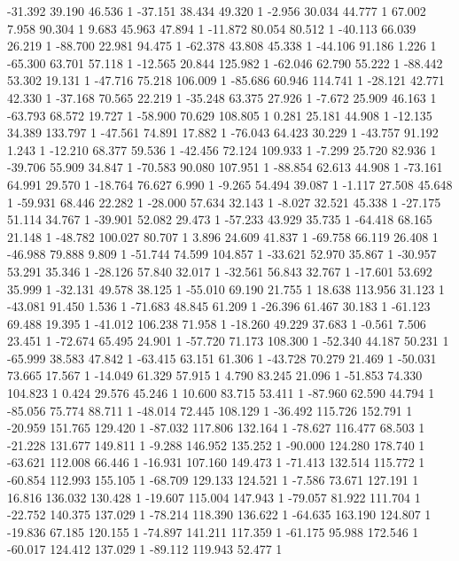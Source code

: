	-31.392 39.190 46.536 1
	-37.151 38.434 49.320 1
	-2.956 30.034 44.777 1
	67.002 7.958 90.304 1
	9.683 45.963 47.894 1
	-11.872 80.054 80.512 1
	-40.113 66.039 26.219 1
	-88.700 22.981 94.475 1
	-62.378 43.808 45.338 1
	-44.106 91.186 1.226 1
	-65.300 63.701 57.118 1
	-12.565 20.844 125.982 1
	-62.046 62.790 55.222 1
	-88.442 53.302 19.131 1
	-47.716 75.218 106.009 1
	-85.686 60.946 114.741 1
	-28.121 42.771 42.330 1
	-37.168 70.565 22.219 1
	-35.248 63.375 27.926 1
	-7.672 25.909 46.163 1
	-63.793 68.572 19.727 1
	-58.900 70.629 108.805 1
	0.281 25.181 44.908 1
	-12.135 34.389 133.797 1
	-47.561 74.891 17.882 1
	-76.043 64.423 30.229 1
	-43.757 91.192 1.243 1
	-12.210 68.377 59.536 1
	-42.456 72.124 109.933 1
	-7.299 25.720 82.936 1
	-39.706 55.909 34.847 1
	-70.583 90.080 107.951 1
	-88.854 62.613 44.908 1
	-73.161 64.991 29.570 1
	-18.764 76.627 6.990 1
	-9.265 54.494 39.087 1
	-1.117 27.508 45.648 1
	-59.931 68.446 22.282 1
	-28.000 57.634 32.143 1
	-8.027 32.521 45.338 1
	-27.175 51.114 34.767 1
	-39.901 52.082 29.473 1
	-57.233 43.929 35.735 1
	-64.418 68.165 21.148 1
	-48.782 100.027 80.707 1
	3.896 24.609 41.837 1
	-69.758 66.119 26.408 1
	-46.988 79.888 9.809 1
	-51.744 74.599 104.857 1
	-33.621 52.970 35.867 1
	-30.957 53.291 35.346 1
	-28.126 57.840 32.017 1
	-32.561 56.843 32.767 1
	-17.601 53.692 35.999 1
	-32.131 49.578 38.125 1
	-55.010 69.190 21.755 1
	18.638 113.956 31.123 1
	-43.081 91.450 1.536 1
	-71.683 48.845 61.209 1
	-26.396 61.467 30.183 1
	-61.123 69.488 19.395 1
	-41.012 106.238 71.958 1
	-18.260 49.229 37.683 1
	-0.561 7.506 23.451 1
	-72.674 65.495 24.901 1
	-57.720 71.173 108.300 1
	-52.340 44.187 50.231 1
	-65.999 38.583 47.842 1
	-63.415 63.151 61.306 1
	-43.728 70.279 21.469 1
	-50.031 73.665 17.567 1
	-14.049 61.329 57.915 1
	4.790 83.245 21.096 1
	-51.853 74.330 104.823 1
	0.424 29.576 45.246 1
	10.600 83.715 53.411 1
	-87.960 62.590 44.794 1
	-85.056 75.774 88.711 1
	-48.014 72.445 108.129 1
	-36.492 115.726 152.791 1
	-20.959 151.765 129.420 1
	-87.032 117.806 132.164 1
	-78.627 116.477 68.503 1
	-21.228 131.677 149.811 1
	-9.288 146.952 135.252 1
	-90.000 124.280 178.740 1
	-63.621 112.008 66.446 1
	-16.931 107.160 149.473 1
	-71.413 132.514 115.772 1
	-60.854 112.993 155.105 1
	-68.709 129.133 124.521 1
	-7.586 73.671 127.191 1
	16.816 136.032 130.428 1
	-19.607 115.004 147.943 1
	-79.057 81.922 111.704 1
	-22.752 140.375 137.029 1
	-78.214 118.390 136.622 1
	-64.635 163.190 124.807 1
	-19.836 67.185 120.155 1
	-74.897 141.211 117.359 1
	-61.175 95.988 172.546 1
	-60.017 124.412 137.029 1
	-89.112 119.943 52.477 1
